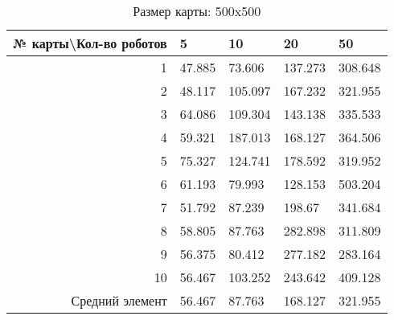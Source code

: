 \begin{table}[H]
\centering
\begin{tabular}{|r|l|l|l|l|}
\hline
№ карты\textbackslash Кол-во роботов & \textbf{5} & \textbf{10} & \textbf{20} & \textbf{50}\\ \hline
1 & 47.885 & 73.606 & 137.273 & 308.648\\ \hline
2 & 48.117 & 105.097 & 167.232 & 321.955\\ \hline
3 & 64.086 & 109.304 & 143.138 & 335.533\\ \hline
4 & 59.321 & 187.013 & 168.127 & 364.506\\ \hline
5 & 75.327 & 124.741 & 178.592 & 319.952\\ \hline
6 & 61.193 & 79.993 & 128.153 & 503.204\\ \hline
7 & 51.792 & 87.239 & 198.67 & 341.684\\ \hline
8 & 58.805 & 87.763 & 282.898 & 311.809\\ \hline
9 & 56.375 & 80.412 & 277.182 & 283.164\\ \hline
10 & 56.467 & 103.252 & 243.642 & 409.128\\ \hline
Средний элемент & 56.467 & 87.763 & 168.127 & 321.955\\ \hline
\end{tabular}
\caption*{Размер карты: 500x500}
\end{table}
